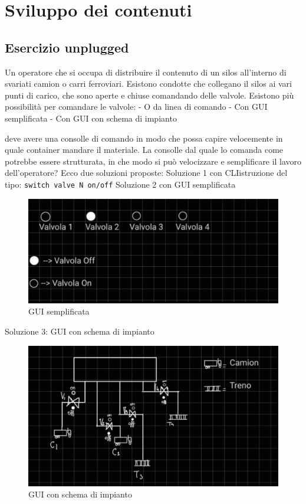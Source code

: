\section{Sviluppo dei contenuti}

\subsection{Esercizio unplugged}
Un operatore che si occupa di distribuire il contenuto di  un silos all'interno di svariati camion o carri ferroviari. Esistono condotte che collegano il silos ai vari punti di carico, che sono aperte e chiuse comandando delle valvole. 
Esistono più possibilità per comandare le valvole:
- O da linea di comando 
- Con GUI semplificata
- Con GUI con schema di impianto

deve avere una consolle di comando in modo che possa capire velocemente in quale container mandare il materiale.
La consolle dal quale lo comanda come potrebbe essere strutturata, in che modo si può velocizzare e semplificare il lavoro dell'operatore?
Ecco due soluzioni proposte:
Soluzione  1 con CLI\@ istruzione del tipo: \texttt{switch valve N on/off} \newline
Soluzione 2 con GUI semplificata\@
\begin{figure}
  \centering
  \includegraphics{img/gui_sempl.png}
  \caption{GUI semplificata}
\end{figure}

\newline

Soluzione 3: GUI con schema di impianto\@
\begin{figure}
  \centering
  \includegraphics{img/gui_con_schema.png}
  \caption{GUI con schema di impianto}
\end{figure}

